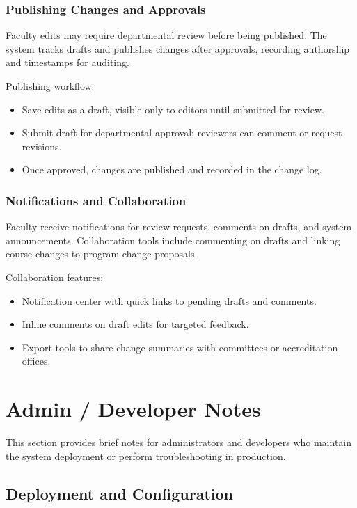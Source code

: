 \documentclass[12pt,letterpaper]{article}
\begin{document}
\subsubsection{Publishing Changes and Approvals}

Faculty edits may require departmental review before being published. The system tracks drafts and publishes changes after approvals, recording authorship and timestamps for auditing.

Publishing workflow:
\begin{itemize}
    \item Save edits as a draft, visible only to editors until submitted for review.
    \item Submit draft for departmental approval; reviewers can comment or request revisions.
    \item Once approved, changes are published and recorded in the change log.
\end{itemize}

\subsubsection{Notifications and Collaboration}

Faculty receive notifications for review requests, comments on drafts, and system announcements. Collaboration tools include commenting on drafts and linking course changes to program change proposals.

Collaboration features:
\begin{itemize}
    \item Notification center with quick links to pending drafts and comments.
    \item Inline comments on draft edits for targeted feedback.
    \item Export tools to share change summaries with committees or accreditation offices.
\end{itemize}

\newpage

\section{Admin / Developer Notes}

This section provides brief notes for administrators and developers who maintain the system deployment or perform troubleshooting in production.

\subsection{Deployment and Configuration}
\end{document}
